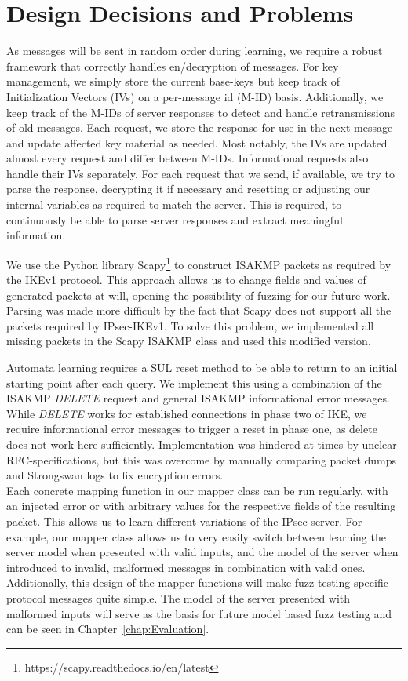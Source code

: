 \section{Design Decisions and Problems} \label{subsec:design}

As messages will be sent in random order during learning, we require a robust framework that correctly handles en/decryption of messages. For key management, we simply store the current base-keys but keep track of Initialization Vectors (IVs) on a per-message id (M-ID) basis. Additionally, we keep track of the M-IDs of server responses to detect and handle retransmissions of old messages. Each request, we store the response for use in the next message and update affected key material as needed. Most notably, the IVs are updated almost every request and differ between M-IDs. Informational requests also handle their IVs separately. For each request that we send, if available, we try to parse the response, decrypting it if necessary and resetting or adjusting our internal variables as required to match the server. This is required, to continuously be able to parse server responses and extract meaningful information.

We use the Python library Scapy\footnote{https://scapy.readthedocs.io/en/latest} to construct ISAKMP packets as required by the IKEv1 protocol. This approach allows us to change fields and values of generated packets at will, opening the possibility of fuzzing for our future work. Parsing was made more difficult by the fact that Scapy does not support all the packets required by IPsec-IKEv1. To solve this problem, we implemented all missing packets in the Scapy ISAKMP class and used this modified version.

Automata learning requires a SUL reset method to be able to return to an initial starting point after each query. We implement this using a combination of the ISAKMP \emph{DELETE} request and general ISAKMP informational error messages. While \emph{DELETE} works for established connections in phase two of IKE, we require informational error messages to trigger a reset in phase one, as delete does not work here sufficiently. Implementation was hindered at times by unclear RFC-specifications, but this was overcome by manually comparing packet dumps and Strongswan logs to fix encryption errors.\\

Each concrete mapping function in our mapper class can be run regularly, with an injected error or with arbitrary values for the respective fields of the resulting packet. This allows us to learn different variations of the IPsec server. For example, our mapper class allows us to very easily switch between learning the server model when presented with valid inputs, and the model of the server when introduced to invalid, malformed messages in combination with valid ones. Additionally, this design of the mapper functions will make fuzz testing specific protocol messages quite simple. The model of the server presented with malformed inputs will serve as the basis for future model based fuzz testing and can be seen in Chapter~\ref{chap:Evaluation}.




